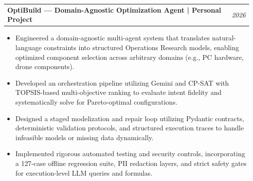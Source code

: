 \documentclass[10pt,letterpaper]{article}
\makeatletter
\newcommand{\heading}[2]{\vspace{2pt}\begin{tabularx}{\textwidth}{@{}Xr@{}}\textbf{#1} & \textit{#2}\end{tabularx}\vspace{-0pt}}
\makeatother
\begin{document}
\heading{OptiBuild --- Domain-Agnostic Optimization Agent | Personal Project}{2026}
\begin{itemize}
\item Engineered a domain-agnostic multi-agent system that translates natural-language constraints into structured Operations Research models, enabling optimized component selection across arbitrary domains (e.g., PC hardware, drone components).
\item Developed an orchestration pipeline utilizing Gemini and CP-SAT with TOPSIS-based multi-objective ranking to evaluate intent fidelity and systematically solve for Pareto-optimal configurations.
\item Designed a staged modelization and repair loop utilizing Pydantic contracts, deterministic validation protocols, and structured execution traces to handle infeasible models or missing data dynamically.
\item Implemented rigorous automated testing and security controls, incorporating a 127-case offline regression suite, PII redaction layers, and strict safety gates for execution-level LLM queries and formulas.
\end{itemize}
\end{document}
